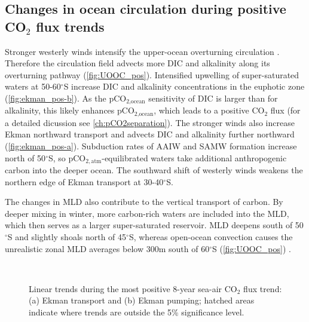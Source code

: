 \clearpage

\subsection{Changes in ocean circulation during positive CO$_2$ flux trends}
\label{sec:trends_pos_circulation}

Stronger westerly winds intensify the upper-ocean overturning circulation \citep{Lauderdale2013}. Therefore the circulation field advects more \acs{DIC} and alkalinity along its overturning pathway (\autoref{fig:UOOC_pos}). Intensified upwelling of super-saturated waters at 50-60$^\circ$S increase \acs{DIC} and alkalinity concentrations in the euphotic zone (\autoref{fig:ekman_pos-b}). As the pCO$_{\text{2,ocean}}$ sensitivity of \acs{DIC} is larger than for alkalinity, this likely enhances pCO$_{\text{2,ocean}}$, which leads to a positive CO$_2$ flux (for a detailed dicussion see \autoref{ch:pCO2separation}). The stronger winds also increase Ekman northward transport and advects \acs{DIC} and alkalinity further northward (\autoref{fig:ekman_pos-a}). Subduction rates of \ac{AAIW} and \ac{SAMW} formation increase north of 50$^\circ$S, so pCO$_{2,\text{atm}}$-equilibrated waters take additional anthropogenic carbon into the deeper ocean. The southward shift of westerly winds weakens the northern edge of Ekman transport at 30-40$^\circ$S. 

The changes in \ac{MLD} also contribute to the vertical transport of carbon. By deeper mixing in winter, more carbon-rich waters are included into the \acs{MLD}, which then serves as a larger super-saturated reservoir. \acs{MLD} deepens south of 50$^\circ$S and slightly shoals north of 45$^\circ$S, whereas open-ocean convection causes the unrealistic zonal \acs{MLD} averages below 300m south of 60$^\circ$S (\autoref{fig:UOOC_pos}) \citep{Sallee2013,Stoessel2015}. 



\begin{figure}[bth]
        \myfloatalign
         \\
        \caption{Linear trends during the most positive 8-year sea-air CO$_2$ flux trend: (a) Ekman transport and (b) Ekman pumping; hatched areas indicate where trends are outside the 5\% significance level.} \label{fig:ekman_pos}
\end{figure}


